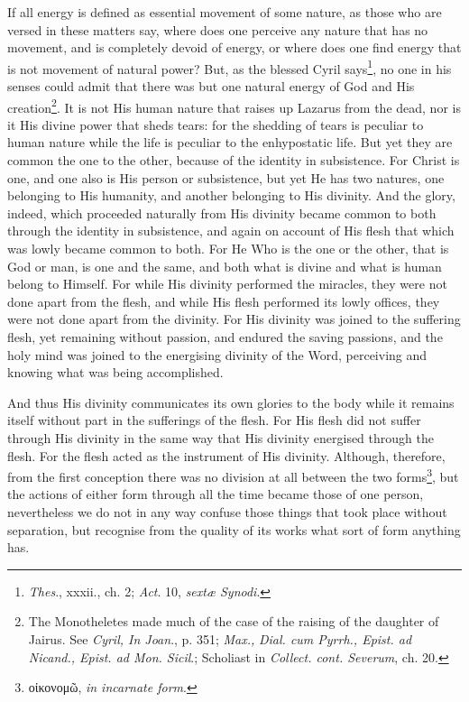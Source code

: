 If all energy is defined as essential movement of some nature, as those who are versed in these matters say, where does one perceive any nature that has no movement, and is completely devoid of energy, or where does one find energy that is not movement of natural power? But, as the blessed Cyril says\footnote{\emph{Thes}., xxxii., ch. 2; \emph{Act}. 10, \emph{sextæ Synodi}.}, no one in his senses could admit that there was but one natural energy of God and His creation\footnote{The Monotheletes made much of the case of the raising of the daughter of Jairus. See \emph{Cyril, In Joan}., p. 351; \emph{Max.,} \emph{Dial. cum Pyrrh., Epist. ad Nicand., Epist. ad Mon. Sicil}.; Scholiast in \emph{Collect. cont. Severum}, ch. 20.}. It is not His human nature that raises up Lazarus from the dead, nor is it His divine power that sheds tears: for the shedding of tears is peculiar to human nature while the life is peculiar to the enhypostatic life. But yet they are common the one to the other, because of the identity in subsistence. For Christ is one, and one also is His person or subsistence, but yet He has two natures, one belonging to His humanity, and another belonging to His divinity. And the glory, indeed, which proceeded naturally from His divinity became common to both through the identity in subsistence, and again on account of His flesh that which was lowly became common to both. For He Who is the one or the other, that is God or man, is one and the same, and both what is divine and what is human belong to Himself. For while His divinity performed the miracles, they were not done apart from the flesh, and while His flesh performed its lowly offices, they were not done apart from the divinity. For His divinity was joined to the suffering flesh, yet remaining without passion, and endured the saving passions, and the holy mind was joined to the energising divinity of the Word, perceiving and knowing what was being accomplished.

And thus His divinity communicates its own glories to the body while it remains itself without part in the sufferings of the flesh. For His flesh did not suffer through His divinity in the same way that His divinity energised through the flesh. For the flesh acted as the instrument of His divinity. Although, therefore, from the first conception there was no division at all between the two forms\footnote{\textgreek{οἰκονομῶ}, \emph{in incarnate form}.}, but the actions of either form through all the time became those of one person, nevertheless we do not in any way confuse those things that took place without separation, but recognise from the quality of its works what sort of form anything has.

